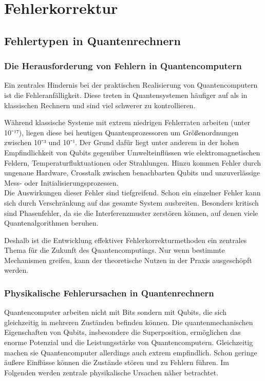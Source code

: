 \chapter{Fehlerkorrektur}
\label{error_correction} %



\section{Fehlertypen in Quantenrechnern}\label{chap:QEC1}
\subsection{Die Herausforderung von Fehlern in Quantencomputern}
 Ein zentrales Hindernis bei der praktischen Realisierung von Quantencomputern ist die Fehleranfälligkeit. Diese treten in Quantensystemen häufiger auf als in klassischen Rechnern und sind viel schwerer zu kontrollieren.

Während klassische Systeme mit extrem niedrigen Fehlerraten arbeiten (unter 10⁻¹⁷), liegen diese bei heutigen Quantenprozessoren um Größenordnungen zwischen 10⁻³ und 10⁻¹. Der Grund dafür liegt unter anderem in der hohen Empfindlichkeit von Qubits gegenüber Umwelteinflüssen wie elektromagnetischen Feldern, Temperaturfluktuationen oder Strahlungen. Hinzu kommen Fehler durch ungenaue Hardware, Crosstalk zwischen benachbarten Qubits und unzuverlässige Mess- oder Initialisierungsprozessen.\cite[Seite 48-49]{tutschku_quantencomputing_2023}\\

Die Auswirkungen dieser Fehler sind tiefgreifend. Schon ein einzelner Fehler kann sich durch Verschränkung auf das gesamte System ausbreiten. Besonders kritisch sind Phasenfehler, da sie die Interferenzmuster zerstören können, auf denen viele Quantenalgorithmen beruhen.

Deshalb ist die Entwicklung effektiver Fehlerkorrekturmethoden ein zentrales Thema für die Zukunft des Quantencomputings. Nur wenn bestimmte Mechanismen greifen, kann der theoretische Nutzen in der Praxis ausgeschöpft werden.


\subsection{Physikalische Fehlerursachen in Quantenrechnern}
Quantencomputer arbeiten nicht mit Bits sondern mit Qubits, die sich gleichzeitig in mehreren Zuständen befinden können. Die quantenmechanischen Eigenschaften von Qubits, insbesondere die Superposition, ermöglichen das enorme Potenzial und die Leistungsstärke von Quantencomputern. Gleichzeitig machen sie Quantencomputer allerdings auch extrem empfindlich. Schon geringe äußere Einflüsse können die Zustände stören und zu Fehlern führen. Im Folgenden werden zentrale physikalische Ursachen näher betrachtet.



